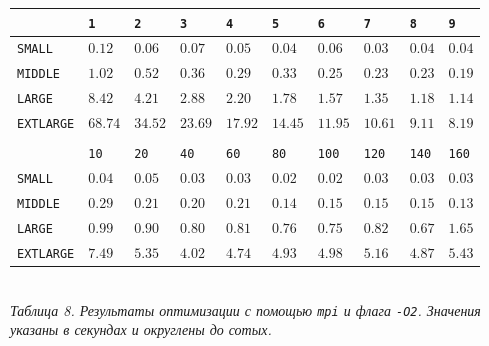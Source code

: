 \documentclass[a4paper, 11pt]{article}
\begin{document}
\begin{center}
    \begin{tabular}{l | l l l l l l l l l}
        & \texttt{1} & \texttt{2} & \texttt{3} & \texttt{4} & \texttt{5} & \texttt{6} & \texttt{7} & \texttt{8} & \texttt{9} \\
        \hline
        \texttt{SMALL}    & $0.12$ & $0.06$ & $0.07$ & $0.05$ & $0.04$ & $0.06$ & $0.03$ & $0.04$ & $0.04$ \\
        \texttt{MIDDLE}   & $1.02$ & $0.52$ & $0.36$ & $0.29$ & $0.33$ & $0.25$ & $0.23$ & $0.23$ & $0.19$ \\
        \texttt{LARGE}    & $8.42$ & $4.21$ & $2.88$ & $2.20$ & $1.78$ & $1.57$ & $1.35$ & $1.18$ & $1.14$ \\
        \texttt{EXTLARGE} & $68.74$ & $34.52$ & $23.69$ & $17.92$ & $14.45$ & $11.95$ & $10.61$ & $9.11$ & $8.19$ \\
        \vspace{0.4cm}\\
        & \texttt{10} & \texttt{20} & \texttt{40} & \texttt{60} & \texttt{80} & \texttt{100} & \texttt{120} & \texttt{140} & \texttt{160} \\
        \hline
        \texttt{SMALL}    & $0.04$ & $0.05$ & $0.03$ & $0.03$ & $0.02$ & $0.02$ & $0.03$ & $0.03$ & $0.03$ \\
        \texttt{MIDDLE}   & $0.29$ & $0.21$ & $0.20$ & $0.21$ & $0.14$ & $0.15$ & $0.15$ & $0.15$ & $0.13$ \\
        \texttt{LARGE}    & $0.99$ & $0.90$ & $0.80$ & $0.81$ & $0.76$ & $0.75$ & $0.82$ & $0.67$ & $1.65$ \\
        \texttt{EXTLARGE} & $7.49$ & $5.35$ & $4.02$ & $4.74$ & $4.93$ & $4.98$ & $5.16$ & $4.87$ & $5.43$ \\
    \end{tabular}\\
    \vspace{0.3cm}
    \small \it
    Таблица 8.  Результаты оптимизации с помощью \texttt{mpi} и флага \texttt{-O2}. Значения указаны в секундах и округлены до сотых.
\end{center}
\newpage
\end{document}
